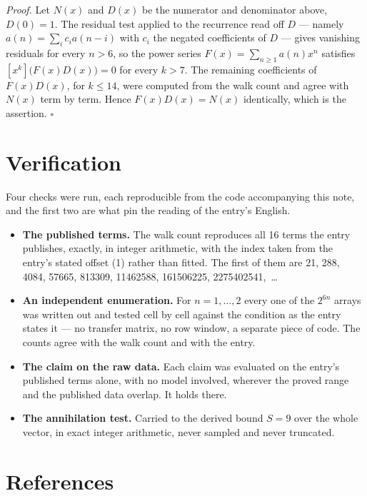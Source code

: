\documentclass[11pt]{article}
\theoremstyle{definition}
\begin{document}
{\itshape Proof.} Let $N(x)$ and $D(x)$ be the numerator and denominator above, $D(0)=1$. The residual test applied to the recurrence read off $D$ --- namely $a(n) = \sum_i c_i a(n-i)$ with $c_i$ the negated coefficients of $D$ --- gives vanishing residuals for every $n > 6$, so the power series $F(x)=\sum_{n\ge 1}a(n)x^n$ satisfies $[x^k]\bigl(F(x)D(x)\bigr) = 0$ for every $k > 7$. The remaining coefficients of $F(x)D(x)$, for $k \le 14$, were computed from the walk count and agree with $N(x)$ term by term. Hence $F(x)D(x) = N(x)$ identically, which is the assertion. $\square$

\section{Verification}

Four checks were run, each reproducible from the code accompanying this note, and the first two are what pin the reading of the entry's English.

\begin{itemize}

\item {\bfseries The published terms.} The walk count reproduces all 16 terms the entry publishes, exactly, in integer arithmetic, with the index taken from the entry's stated offset (1) rather than fitted. The first of them are 21, 288, 4084, 57665, 813309, 11462588, 161506225, 2275402541,~\dots

\item {\bfseries An independent enumeration.} For $n = 1,\dots,2$ every one of the $2^{6n}$ arrays was written out and tested cell by cell against the condition as the entry states it --- no transfer matrix, no row window, a separate piece of code. The counts agree with the walk count and with the entry.

\item {\bfseries The claim on the raw data.} Each claim was evaluated on the entry's published terms alone, with no model involved, wherever the proved range and the published data overlap. It holds there.

\item {\bfseries The annihilation test.} Carried to the derived bound $S = 9$ over the whole vector, in exact integer arithmetic, never sampled and never truncated.

\end{itemize}

\section{References}
\end{document}
